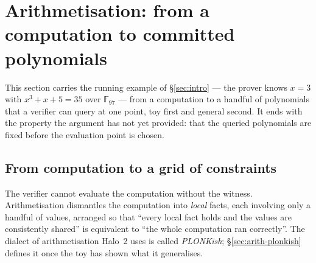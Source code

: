 \documentclass[11pt,a4paper]{article}
\theoremstyle{definition}
\renewcommand{\sectionmark}[1]{\markboth{\thesection\ \ #1}{}}
\newcommand{\F}{\mathbb{F}}
\begin{document}

\section{Arithmetisation: from a computation to committed polynomials}
\label{sec:arith}
\sectionmark{Arithmetisation}

This section carries the running example of \S\ref{sec:intro} --- the
prover knows $x = 3$ with $x^3 + x + 5 = 35$ over $\F_{97}$ --- from a
computation to a handful of polynomials that a verifier can query at one
point, toy first and general second. It ends with the property the
argument has not yet provided: that the queried polynomials are fixed
before the evaluation point is chosen.

\subsection{From computation to a grid of constraints}
\label{sec:arith-grid}

The verifier cannot evaluate the computation without the witness.
Arithmetisation dismantles the computation into \emph{local} facts, each
involving only a handful of values, arranged so that ``every local fact holds
and the values are consistently shared'' is equivalent to ``the whole
computation ran correctly''. The dialect of arithmetisation Halo~2 uses is
called \emph{PLONKish}; \S\ref{sec:arith-plonkish} defines it once the toy has
shown what it generalises.
\end{document}
